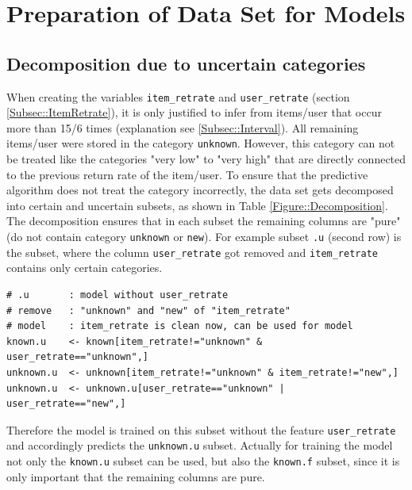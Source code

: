 \documentclass[a4paper,12pt]{article}
\begin{document}
\section{Preparation of Data Set for Models}

\subsection{Decomposition due to uncertain categories}\label{Subsec::4Split}
When creating the variables \texttt{item\_retrate} and \texttt{user\_retrate} (section \ref{Subsec::ItemRetrate}), it is only justified to infer from items/user that occur more than 15/6 times (explanation see \ref{Subsec::Interval}). All remaining items/user were stored in the category \texttt{unknown}. However, this category can not be treated like the categories "very low" to "very high" that are directly connected to the previous return rate of the item/user. To ensure that the predictive algorithm does not treat the category incorrectly, the data set gets decomposed into certain and uncertain subsets, as shown in Table \ref{Figure::Decomposition}. The decomposition ensures that in each subset the remaining columns are "pure" (do not contain category \texttt{unknown} or \texttt{new}). For example subset \texttt{.u} (second row) is the subset, where the column \texttt{user\_retrate} got removed and \texttt{item\_retrate} contains only certain categories. 
\begin{lstlisting}
# .u       : model without user_retrate
# remove   : "unknown" and "new" of "item_retrate"
# model    : item_retrate is clean now, can be used for model
known.u    <- known[item_retrate!="unknown" & user_retrate=="unknown",]
unknown.u  <- unknown[item_retrate!="unknown" & item_retrate!="new",]
unknown.u  <- unknown.u[user_retrate=="unknown" | user_retrate=="new",]
\end{lstlisting}
Therefore the model is trained on this subset without the feature \texttt{user\_retrate} and accordingly predicts the \texttt{unknown.u} subset. Actually for training the model not only the \texttt{known.u} subset can be used, but also the \texttt{known.f} subset, since it is only important that the remaining columns are pure.\\
\end{document}
